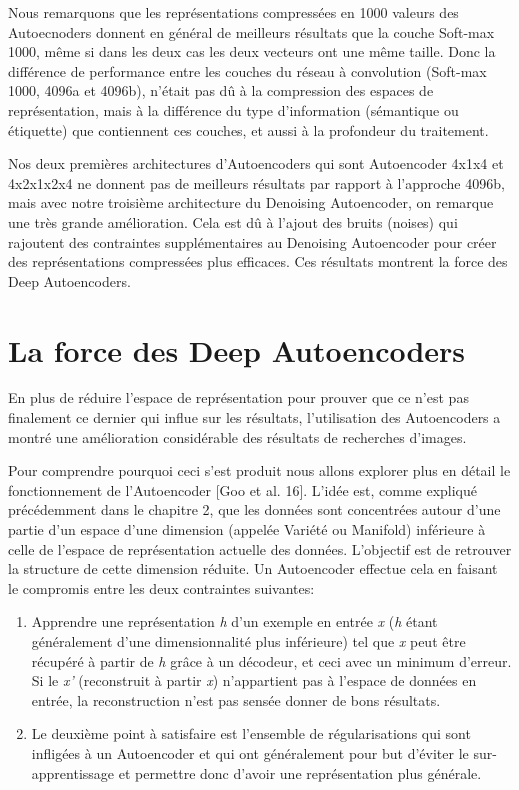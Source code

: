 	Nous remarquons que les représentations compressées en 1000 valeurs des Autoecnoders donnent en général de meilleurs résultats que la couche Soft-max 1000, même si dans les deux cas les deux vecteurs ont une même taille. Donc la différence de performance entre les couches du réseau à convolution (Soft-max 1000, 4096a et 4096b), n’était pas dû à la compression des espaces de représentation, mais à la différence du type d'information (sémantique ou étiquette) que contiennent ces couches, et aussi à la profondeur du traitement.
	
	Nos deux premières architectures d'Autoencoders qui sont Autoencoder 4x1x4 et 4x2x1x2x4 ne donnent pas de meilleurs résultats par rapport à l'approche 4096b, mais avec notre troisième architecture du Denoising Autoencoder, on remarque une très grande amélioration. Cela est dû à l'ajout des bruits (noises) qui rajoutent des contraintes supplémentaires au Denoising Autoencoder pour créer des représentations compressées plus efficaces. Ces résultats montrent la force des Deep Autoencoders.


\section{La force des Deep Autoencoders}
	En plus de réduire l'espace de représentation pour prouver que ce n'est pas finalement ce dernier qui influe sur les résultats, l'utilisation des Autoencoders a montré une amélioration considérable des résultats de recherches d'images.

	Pour comprendre pourquoi ceci s'est produit nous allons explorer plus en détail le fonctionnement de l'Autoencoder [Goo et al. 16]. L’idée est, comme expliqué précédemment dans le chapitre 2, que les données sont concentrées autour d'une partie d'un espace d'une dimension (appelée Variété ou Manifold) inférieure à celle de l'espace de représentation actuelle des données. L'objectif est de retrouver la structure de cette dimension réduite. Un Autoencoder effectue cela en faisant le compromis entre les deux contraintes suivantes:

\begin{enumerate}[i]
\item Apprendre une représentation \textit{h} d'un exemple en entrée \textit{x} (\textit{h} étant généralement d'une dimensionnalité plus inférieure) tel que \textit{x} peut être récupéré à partir de \textit{h} grâce à un décodeur, et ceci avec un minimum d'erreur. Si le \textit{x'} (reconstruit à partir \textit{x}) n'appartient pas à l'espace de données en entrée, la reconstruction n'est pas sensée donner de bons résultats.

\item Le deuxième point à satisfaire est l'ensemble de régularisations qui sont infligées à un Autoencoder et qui ont généralement pour but d’éviter le sur-apprentissage et permettre donc d'avoir une représentation plus générale.

\end{enumerate}


